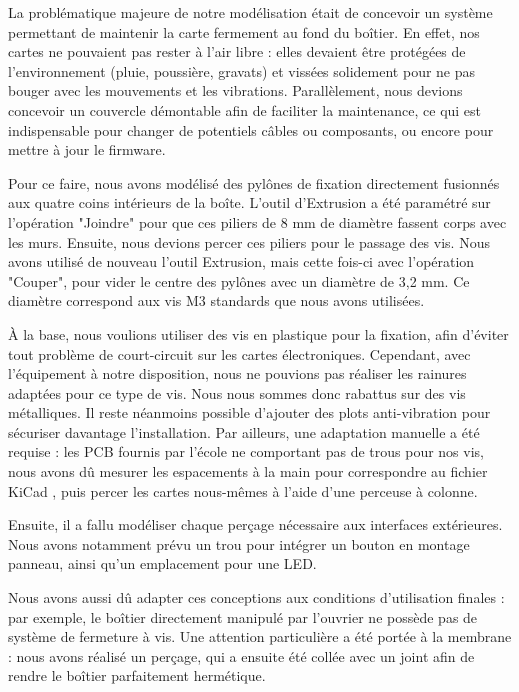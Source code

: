 La problématique majeure de notre modélisation était de concevoir un système permettant de maintenir la carte fermement au fond du boîtier. En effet, nos cartes ne pouvaient pas rester à l'air libre : elles devaient être protégées de l'environnement (pluie, poussière, gravats) et vissées solidement pour ne pas bouger avec les mouvements et les vibrations. Parallèlement, nous devions concevoir un couvercle démontable afin de faciliter la maintenance, ce qui est indispensable pour changer de potentiels câbles ou composants, ou encore pour mettre à jour le firmware.

Pour ce faire, nous avons modélisé des pylônes de fixation directement fusionnés aux quatre coins intérieurs de la boîte. L'outil d’Extrusion a été paramétré sur l'opération "Joindre" pour que ces piliers de 8 mm de diamètre fassent corps avec les murs. Ensuite, nous devions percer ces piliers pour le passage des vis. Nous avons utilisé de nouveau l'outil Extrusion, mais cette fois-ci avec l'opération "Couper", pour vider le centre des pylônes avec un diamètre de 3,2 mm. Ce diamètre correspond aux vis M3 standards que nous avons utilisées.

À la base, nous voulions utiliser des vis en plastique pour la fixation, afin d'éviter tout problème de court-circuit sur les cartes électroniques. Cependant, avec l'équipement à notre disposition, nous ne pouvions pas réaliser les rainures adaptées pour ce type de vis. Nous nous sommes donc rabattus sur des vis métalliques. Il reste néanmoins possible d'ajouter des plots anti-vibration pour sécuriser davantage l'installation. Par ailleurs, une adaptation manuelle a été requise : les PCB fournis par l'école ne comportant pas de trous pour nos vis, nous avons dû mesurer les espacements à la main pour correspondre au fichier KiCad \cite{KiCad}, puis percer les cartes nous-mêmes à l'aide d'une perceuse à colonne.

Ensuite, il a fallu modéliser chaque perçage nécessaire aux interfaces extérieures. Nous avons notamment prévu un trou pour intégrer un bouton en montage panneau, ainsi qu'un emplacement pour une LED. 

Nous avons aussi dû adapter ces conceptions aux conditions d'utilisation finales : par exemple, le boîtier directement manipulé par l'ouvrier ne possède pas de système de fermeture à vis. Une attention particulière a été portée à la membrane : nous avons réalisé un perçage, qui a ensuite été collée avec un joint afin de rendre le boîtier parfaitement hermétique. 

